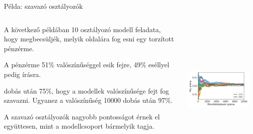 \documentclass[english, aspectratio=169]{beamer}
\begin{document}
\begin{frame}{Példa: szavazó osztályozók}
\begin{columns}
\begin{column}{.5\textwidth}
A következő példában 10 osztályozó modell feladata, hogy megbecsüljék, melyik oldalára fog esni egy torzított pénzérme.\par\medskip
A pénzérme 51\% valószínűséggel esik fejre, 49\% eséllyel pedig írásra.\par{} dobás után 75\%, hogy a modellek valószínűsége fejt fog szavazni. Ugyanez a valószínűség 10000 dobás után 97\%.\par\medskip
A szavazó osztályozók nagyobb pontosságot érnek el együttesen, mint a modellcsoport bármelyik tagja. 
\end{column}
\begin{column}{.5\textwidth}
\begin{center}
\includegraphics[width=7cm, height=7cm, keepaspectratio]{images/ensemble_1.png}
\end{center}
\end{column}
\end{columns}
\end{frame}
\end{document}
